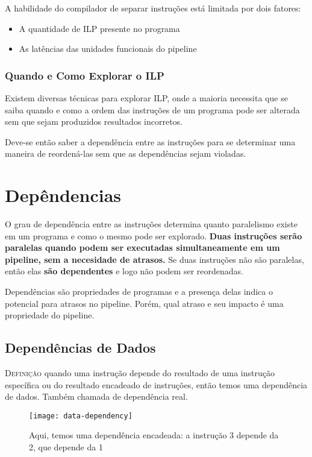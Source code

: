 A habilidade do compilador de separar instruções está limitada por dois fatores:
\begin{itemize}
  \item A quantidade de ILP presente no programa

  \item As latências das unidades funcionais do pipeline
\end{itemize}

\subsubsection{Quando e Como Explorar o ILP}
Existem diversas técnicas para explorar ILP, onde a maioria necessita que se saiba quando e como a ordem das instruções de um programa pode ser alterada sem que sejam produzidos resultados incorretos.

Deve-se então saber a dependência entre as instruções para se determinar uma maneira de reordená-las sem que as dependências sejam violadas.





\section{Depêndencias}
O grau de dependência entre as instruções determina quanto paralelismo existe em um programa e como o mesmo pode ser explorado. \textbf{Duas instruções serão paralelas quando podem ser executadas simultaneamente em um pipeline, sem a necesidade de atrasos.} Se duas instruções não são paralelas, então elas \textbf{são dependentes} e logo não podem ser reordenadas.

Dependências são propriedades de programas e a presença delas indica o potencial para atrasos no pipeline. Porém, qual atraso e seu impacto é uma propriedade do pipeline.




\subsection{Dependências de Dados}
\textsc{Definição} quando uma instrução depende do resultado de uma instrução específica ou do resultado encadeado de instruções, então temos uma dependência de dados. Também chamada de dependência real.

\begin{figure}[ht]
  \centering
  \texttt{[image: data-dependency]}
  \caption{Aqui, temos uma dependência encadeada: a instrução 3 depende da 2, que depende da 1}
  \label{fig:data-dependency}
\end{figure}


